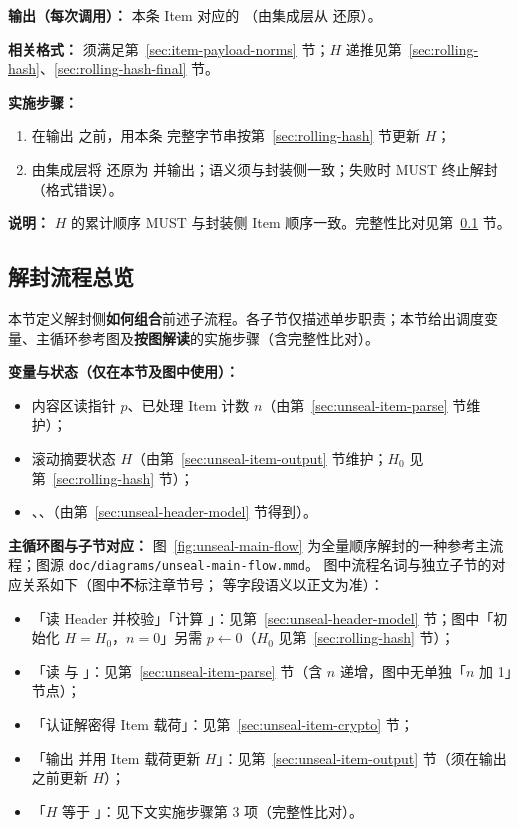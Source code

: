 \textbf{输出（每次调用）：}
本条 Item 对应的 （由集成层从  还原）。

\textbf{相关格式：}
 须满足第~\ref{sec:item-payload-norms} 节；$H$ 递推见第~\ref{sec:rolling-hash}、\ref{sec:rolling-hash-final} 节。

\textbf{实施步骤：}
\begin{enumerate}
  \item 在输出  之前，用本条  完整字节串按第~\ref{sec:rolling-hash} 节更新 $H$；
  \item 由集成层将  还原为  并输出；语义须与封装侧一致；失败时 MUST 终止解封（格式错误）。
\end{enumerate}

\textbf{说明：}
$H$ 的累计顺序 MUST 与封装侧 Item 顺序一致。完整性比对见第~\ref{sec:unseal-total-algorithm} 节。

\subsection{解封流程总览}\label{sec:unseal-total-algorithm}\label{sec:unseal-main-flow}
本节定义解封侧\textbf{如何组合}前述子流程。各子节仅描述单步职责；本节给出调度变量、主循环参考图及\textbf{按图解读}的实施步骤（含完整性比对）。

\textbf{变量与状态（仅在本节及图中使用）：}
\begin{itemize}
  \item 内容区读指针 $p$、已处理 Item 计数 $n$（由第~\ref{sec:unseal-item-parse} 节维护）；
  \item 滚动摘要状态 $H$（由第~\ref{sec:unseal-item-output} 节维护；$H_0$ 见第~\ref{sec:rolling-hash} 节）；
  \item {}、、（由第~\ref{sec:unseal-header-model} 节得到）。
\end{itemize}

\textbf{主循环图与子节对应：}
图~\ref{fig:unseal-main-flow} 为全量顺序解封的一种参考主流程；图源 \texttt{doc/diagrams/unseal-main-flow.mmd}。
图中流程名词与独立子节的对应关系如下（图中\textbf{不}标注章节号； 等字段语义以正文为准）：
\begin{itemize}
  \item 「读 Header 并校验」「计算 」：见第~\ref{sec:unseal-header-model} 节；图中「初始化 $H = H_0$，$n = 0$」另需 $p \leftarrow 0$（$H_0$ 见第~\ref{sec:rolling-hash} 节）；
  \item 「读  与 」：见第~\ref{sec:unseal-item-parse} 节（含 $n$ 递增，图中无单独「$n$ 加 1」节点）；
  \item 「认证解密得 Item 载荷」：见第~\ref{sec:unseal-item-crypto} 节；
  \item 「输出  并用 Item 载荷更新 $H$」：见第~\ref{sec:unseal-item-output} 节（须在输出  之前更新 $H$）；
  \item 「$H$ 等于 」：见下文实施步骤第 3 项（完整性比对）。
\end{itemize}

